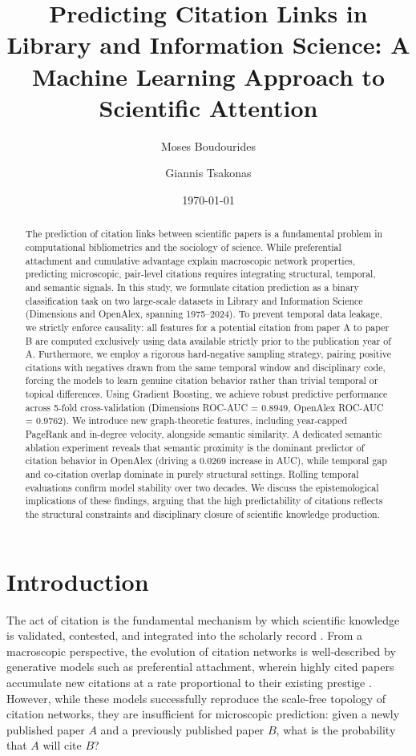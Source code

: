 \documentclass[11pt,a4paper]{article}
\title{\textbf{Predicting Citation Links in Library and Information Science: A Machine Learning Approach to Scientific Attention}}
\author[1]{Moses Boudourides}
\author[2]{Giannis Tsakonas}
\affil[1]{Department of Mathematics, University of Patras, Greece}
\affil[2]{Library \& Information Center, University of Patras, Greece}
\date{\today}
\begin{document}
\maketitle

\begin{abstract}
The prediction of citation links between scientific papers is a fundamental problem in computational bibliometrics and the sociology of science. While preferential attachment and cumulative advantage explain macroscopic network properties, predicting microscopic, pair-level citations requires integrating structural, temporal, and semantic signals. In this study, we formulate citation prediction as a binary classification task on two large-scale datasets in Library and Information Science (Dimensions and OpenAlex, spanning 1975--2024). To prevent temporal data leakage, we strictly enforce causality: all features for a potential citation from paper A to paper B are computed exclusively using data available strictly prior to the publication year of A. Furthermore, we employ a rigorous hard-negative sampling strategy, pairing positive citations with negatives drawn from the same temporal window and disciplinary code, forcing the models to learn genuine citation behavior rather than trivial temporal or topical differences. Using Gradient Boosting, we achieve robust predictive performance across 5-fold cross-validation (Dimensions ROC-AUC = 0.8949, OpenAlex ROC-AUC = 0.9762). We introduce new graph-theoretic features, including year-capped PageRank and in-degree velocity, alongside semantic similarity. A dedicated semantic ablation experiment reveals that semantic proximity is the dominant predictor of citation behavior in OpenAlex (driving a 0.0269 increase in AUC), while temporal gap and co-citation overlap dominate in purely structural settings. Rolling temporal evaluations confirm model stability over two decades. We discuss the epistemological implications of these findings, arguing that the high predictability of citations reflects the structural constraints and disciplinary closure of scientific knowledge production.
\end{abstract}

\section{Introduction}
The act of citation is the fundamental mechanism by which scientific knowledge is validated, contested, and integrated into the scholarly record \cite{merton1968matthew, price1965networks}. From a macroscopic perspective, the evolution of citation networks is well-described by generative models such as preferential attachment, wherein highly cited papers accumulate new citations at a rate proportional to their existing prestige \cite{barabasi1999emergence}. However, while these models successfully reproduce the scale-free topology of citation networks, they are insufficient for microscopic prediction: given a newly published paper $A$ and a previously published paper $B$, what is the probability that $A$ will cite $B$?
\end{document}
